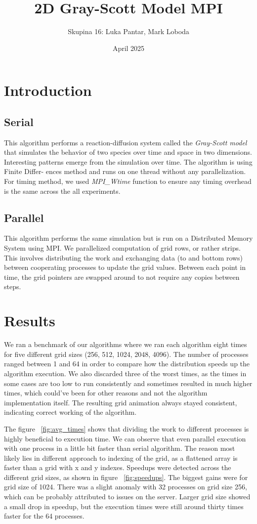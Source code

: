 \documentclass{article}
\title{2D Gray-Scott Model MPI}
\author{Skupina 16: Luka Pantar, Mark Loboda}
\date{April 2025}
\begin{document}
\maketitle

\section{Introduction}
\subsection{Serial}
This algorithm performs a reaction-diffusion system called the \textit{Gray-Scott model} that simulates the behavior of two species over time and space in two dimensions. Interesting patterns emerge from the simulation over time. The algorithm is using Finite Differ-
ences method and runs on one thread without any parallelization. For timing method, we used \textit{MPI\_Wtime} function to ensure any timing overhead is the same across the all experiments.

\subsection{Parallel}
This algorithm performs the same simulation but is run on a Distributed Memory System using MPI. We parallelized computation of grid rows, or rather strips. This involves distributing the work and exchanging data (to and bottom rows) between cooperating processes to update the grid values. Between each point in time, the grid pointers are swapped around to not require any copies between steps.

\section{Results}
We ran a benchmark of our algorithms where we ran each algorithm eight times for five different grid sizes (256, 512, 1024, 2048, 4096). The number of processes ranged between 1 and 64 in order to compare how the distribution speeds up the algorithm execution. We also discarded three of the worst times, as the times in some cases are too low to run consistently and sometimes resulted in much higher times, which could’ve been for other reasons and not the algorithm implementation itself. The resulting grid animation always stayed consistent, indicating correct working of the algorithm.


The figure ~\ref{fig:avg_times} shows that dividing the work to different processes is highly beneficial to execution time. We can observe that even parallel execution with one process in a little bit faster than serial algorithm. The reason most likely lies in different approach to indexing of the grid, as a flattened array is faster than a grid with x and y indexes.
Speedups were detected across the different grid sizes, as shown in figure ~\ref{fig:speedups}. The biggest gains were for grid size of 1024. There was a slight anomaly with 32 processes on grid size 256, which can be probably attributed to issues on the server. Larger grid size showed a small drop in speedup, but the execution times were still around thirty times faster for the 64 processes.
\end{document}
